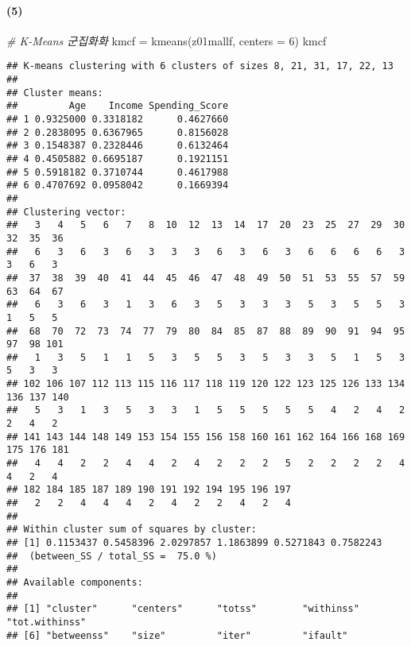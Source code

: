 \documentclass[
]{article}
\newenvironment{Shaded}{\begin{snugshade}}{\end{snugshade}}
\newcommand{\AttributeTok}[1]{\textcolor[rgb]{0.77,0.63,0.00}{#1}}
\newcommand{\CommentTok}[1]{\textcolor[rgb]{0.56,0.35,0.01}{\textit{#1}}}
\newcommand{\DecValTok}[1]{\textcolor[rgb]{0.00,0.00,0.81}{#1}}
\newcommand{\FunctionTok}[1]{\textcolor[rgb]{0.00,0.00,0.00}{#1}}
\newcommand{\NormalTok}[1]{#1}
\newcommand{\OtherTok}[1]{\textcolor[rgb]{0.56,0.35,0.01}{#1}}
\newcommand{\SpecialCharTok}[1]{\textcolor[rgb]{0.00,0.00,0.00}{#1}}
\begin{document}
\hypertarget{section-14}{%
\paragraph{(5)}\label{section-14}}

\begin{Shaded}
\begin{Highlighting}[]
\CommentTok{\# K{-}Means 군집화화}
\NormalTok{kmcf }\OtherTok{=} \FunctionTok{kmeans}\NormalTok{(z01mallf, }\AttributeTok{centers =} \DecValTok{6}\NormalTok{)}
\NormalTok{kmcf}
\end{Highlighting}
\end{Shaded}

\begin{verbatim}
## K-means clustering with 6 clusters of sizes 8, 21, 31, 17, 22, 13
## 
## Cluster means:
##         Age    Income Spending_Score
## 1 0.9325000 0.3318182      0.4627660
## 2 0.2838095 0.6367965      0.8156028
## 3 0.1548387 0.2328446      0.6132464
## 4 0.4505882 0.6695187      0.1921151
## 5 0.5918182 0.3710744      0.4617988
## 6 0.4707692 0.0958042      0.1669394
## 
## Clustering vector:
##   3   4   5   6   7   8  10  12  13  14  17  20  23  25  27  29  30  32  35  36 
##   6   3   6   3   6   3   3   3   6   3   6   3   6   6   6   6   3   3   6   3 
##  37  38  39  40  41  44  45  46  47  48  49  50  51  53  55  57  59  63  64  67 
##   6   3   6   3   1   3   6   3   5   3   3   3   5   3   5   5   3   1   5   5 
##  68  70  72  73  74  77  79  80  84  85  87  88  89  90  91  94  95  97  98 101 
##   1   3   5   1   1   5   3   5   5   3   5   3   3   5   1   5   3   5   3   3 
## 102 106 107 112 113 115 116 117 118 119 120 122 123 125 126 133 134 136 137 140 
##   5   3   1   3   5   3   3   1   5   5   5   5   5   4   2   4   2   2   4   2 
## 141 143 144 148 149 153 154 155 156 158 160 161 162 164 166 168 169 175 176 181 
##   4   4   2   2   4   4   2   4   2   2   2   5   2   2   2   2   4   4   2   4 
## 182 184 185 187 189 190 191 192 194 195 196 197 
##   2   2   4   4   4   2   4   2   2   4   2   4 
## 
## Within cluster sum of squares by cluster:
## [1] 0.1153437 0.5458396 2.0297857 1.1863899 0.5271843 0.7582243
##  (between_SS / total_SS =  75.0 %)
## 
## Available components:
## 
## [1] "cluster"      "centers"      "totss"        "withinss"     "tot.withinss"
## [6] "betweenss"    "size"         "iter"         "ifault"
\end{verbatim}

\begin{Shaded}
\end{Shaded}
\end{document}
